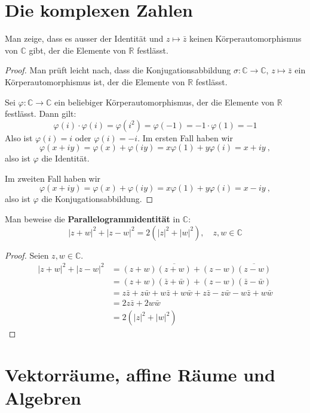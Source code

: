 \section{Die komplexen Zahlen}

\setcounter{aufgabe}{7}
\begin{aufgabe}
	Man zeige, dass es ausser der Identität und $z \mapsto \bar z$ keinen Körperautomorphismus von
	$\mathbb C$ gibt, der die Elemente von $\mathbb R$ festlässt.
\end{aufgabe}
\begin{proof}
	Man prüft leicht nach, dass die Konjugationsabbildung $\sigma: \mathbb C \to \mathbb C$, 
	$z \mapsto \bar z$ ein Körperautomorphismus ist, der die Elemente von $\mathbb R$ festlässt.

	Sei $\varphi: \mathbb C \to \mathbb C$ ein beliebiger Körperautomorphismus, der die Elemente
	von $\mathbb R$ festlässt. Dann gilt:
	\[
		\varphi(i) \cdot \varphi(i)
			= \varphi(i^2) = \varphi(-1) = -1 \cdot \varphi(1) = -1
	\]
	Also ist $\varphi(i) = i$ oder $\varphi(i) = -i$.
	Im ersten Fall haben wir
	\[
		\varphi(x + iy) = \varphi(x) + \varphi(iy) = x \varphi(1) + y \varphi(i)
			= x + iy \ ,
	\]
	also ist $\varphi$ die Identität.

	Im zweiten Fall haben wir
	\[
		\varphi(x + iy) = \varphi(x) + \varphi(iy) = x \varphi(1) + y \varphi(i)
			= x - iy \ ,
	\]
	also ist $\varphi$ die Konjugationsabbildung.


\end{proof}

\setcounter{aufgabe}{10}
\begin{aufgabe}
	Man beweise die \textbf{Parallelogrammidentität} in $\mathbb C$:
	\[
		|z + w|^2 + |z - w|^2 = 2( |z|^2 + |w|^2), \quad z, w \in \mathbb C
	\]
\end{aufgabe}
\begin{proof}
	Seien $z, w \in \mathbb C$.
	\begin{align*}
		|z + w|^2 + |z - w|^2
			&= (z+w) \overline{(z + w)} + (z-w) \overline{ (z-w) } \\
			&= (z + w) (\bar z + \bar w) + (z - w) (\bar z - \bar w) \\
			&= z \bar z + z \bar w + w \bar z + w \bar w + z \bar z - z \bar w - w \bar z + w \bar w \\
			&= 2 z \bar z + 2 w \bar w \\
			&= 2 \left( |z|^2 + |w|^2 \right)
	\end{align*}
\end{proof}

\section{Vektorräume, affine Räume und Algebren}
